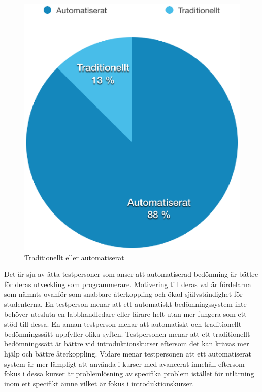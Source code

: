 \documentclass[a4paper,11pt]{article}
\begin{document}
{\begin{figure}[ht!]
\centering
\includegraphics[scale=0.5]{trad_vs_auto.eps}
\caption{Traditionellt eller automatiserat}
\label{fig:TradvsAuto}
\end{figure}

Det är sju av åtta testpersoner som anser att automatiserad bedömning är bättre för deras utveckling som programmerare. Motivering till deras val är fördelarna som nämnts ovanför som snabbare återkoppling och ökad självständighet för studenterna. En testperson menar att ett automatiskt bedömningssystem inte behöver utesluta en labbhandledare eller lärare helt utan mer fungera som ett stöd till dessa. En annan testperson menar att automatiskt och traditionellt bedömningssätt uppfyller olika syften. Testpersonen menar att ett traditionellt bedömningssätt är bättre vid introduktionskurser eftersom det kan krävas mer hjälp och bättre återkoppling. Vidare menar testpersonen att ett automatiserat system är mer lämpligt att använda i kurser med avancerat innehåll eftersom fokus i dessa kurser är problemlösning av specifika problem istället för utlärning inom ett specifikt ämne vilket är fokus i introduktionskurser.

}
\end{document}
